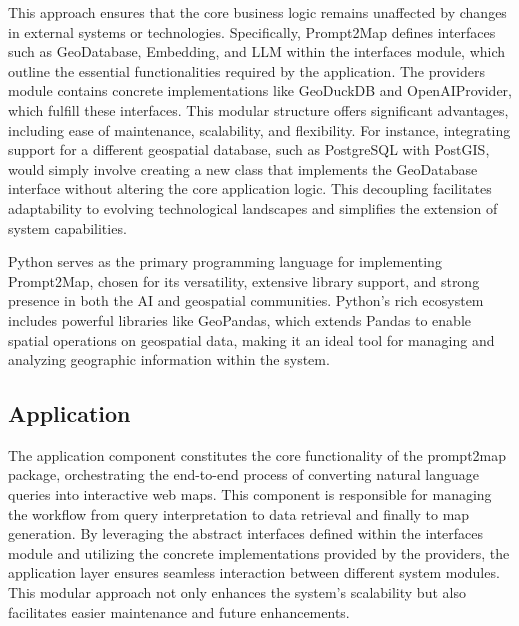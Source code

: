 This approach ensures that the core business logic remains unaffected by changes in external systems or technologies. Specifically, Prompt2Map defines interfaces such as GeoDatabase, Embedding, and LLM within the interfaces module, which outline the essential functionalities required by the application. The providers module contains concrete implementations like GeoDuckDB and OpenAIProvider, which fulfill these interfaces. This modular structure offers significant advantages, including ease of maintenance, scalability, and flexibility. For instance, integrating support for a different geospatial database, such as PostgreSQL with PostGIS, would simply involve creating a new class that implements the GeoDatabase interface without altering the core application logic. This decoupling facilitates adaptability to evolving technological landscapes and simplifies the extension of system capabilities.

Python serves as the primary programming language for implementing Prompt2Map, chosen for its versatility, extensive library support, and strong presence in both the AI and geospatial communities. Python’s rich ecosystem includes powerful libraries like GeoPandas, which extends Pandas to enable spatial operations on geospatial data, making it an ideal tool for managing and analyzing geographic information within the system.

\subsection{Application}
The application component constitutes the core functionality of the prompt2map package, orchestrating the end-to-end process of converting natural language queries into interactive web maps. This component is responsible for managing the workflow from query interpretation to data retrieval and finally to map generation. By leveraging the abstract interfaces defined within the interfaces module and utilizing the concrete implementations provided by the providers, the application layer ensures seamless interaction between different system modules. This modular approach not only enhances the system's scalability but also facilitates easier maintenance and future enhancements.

